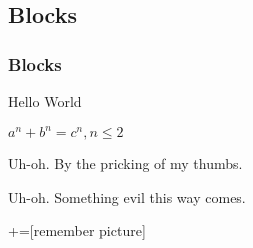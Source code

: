 \subsection{Blocks}
\begin{frame}
\frametitle{Blocks}
\begin{definition}[Greetings]
Hello World
\end{definition}

\begin{theorem}
$a^n + b^n = c^n, n \leq 2$
\end{theorem}

\begin{alertblock}{Uh-oh.}
By the pricking of my thumbs.
\end{alertblock}

\begin{exampleblock}{Uh-oh.}
Something evil this way comes.
\end{exampleblock}

\end{frame}

+=[remember picture]

\everymath{\displaystyle}

